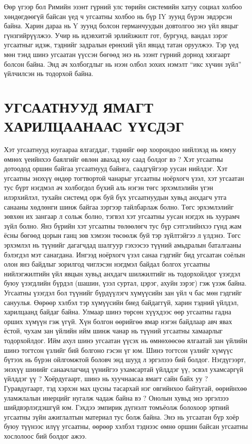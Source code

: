 Өөр үгээр бол Римийн эзэнт гүрний улс төрийн системийн хатуу социал холбоо хөндөгдөөгүй байсан үед ч угсаатны холбоо нь бүр IY зуунд бүрэн эвдэрсэн байна. Харин дараа нь Y зуунд болсон германчуудын довтолгоо энэ үйл явцыг гүнзгийрүүлжээ. Учир нь идэвхитэй эрлийзжилт гот, бургунд, вандал зэрэг угсаатныг идэж, тэднийг задралын ерөнхий үйл явцад татан оруулжээ. Тэр үед мөн тэнд шинэ угсаатан үүссэн бөгөөд энэ нь эзэнт гүрний дорнод хязгаарт болсон байна. Энд ач холбогдлыг нь нээн олбол зохих нэмэлт “икс хүчин зүйл” үйлчилсэн нь тодорхой байна.
\section{УГСААТНУУД ЯМАГТ ХАРИЛЦААНААС ҮҮСДЭГ}
Хэт угсаатнууд юугаараа ялгагддаг, тэднийг өөр хоорондоо нийлэхэд нь юмуу өмнөх үеийнхээ баялгийг өвлөн авахад юу саад болдог вэ ? Хэт угсаатны дотоодод оршин байгаа угсаатнууд байнга, саадгүйгээр уусан нийлдэг. Хэт угсаатны энэхүү өндөр тогтвортой чанарыг угсаатны ноёрхогч үзэл, хэт угсаатан тус бүрт нэгдмэл ач холбогдол бүхий аль нэгэн төгс эрхэмлэлийн үгэн илэрхийлэл, тухайн системд орж буй бүх угсаатнуудын хувьд анхдагч утга санааны хөдлөнги шинж байгаа зэргээр тайлбарлаж болно. Төгс эрхэмлэлийг зөвхөн их зангаар л сольж болно, тэгвэл хэт угсаатны уусан нэгдэх нь хуурамч зүйл болно. Янз бүрийн хэт угсаатны төлөөлөгч тус бүр сэтгэлийнхээ гүнд жам ёсны бөгөөд цорын ганц зөв хэмээн төсөөлж буй тэр зүйлтэйгээ л үлдэнэ. Төгс эрхэмлэл нь түүнийг дагагчдад шалгуур гэхээсээ түүний амьдралын баталгааны бэлэгдэл мэт санагдана. Ингээд ноёрхогч үзэл санаа гэдгийг бид угсаатан соёлын олон янз байдлыг зорилгод чиглэсэн нэгдмэл байдал болгох угсаатны нийлэгжилтийн үйл явцын хувьд анхдагч шилжилтийг нь тодорхойлдог үзэгдэл буюу үзэгдлийн бүрдэл (шашин, үзэл суртал, цэрэг, ахуйн зэрэг) гэж үзэж байна.
Угсаатны үзэгдэл бол түүнийг бүрдүүлэгч хүмүүсийн зан үйл ч бас мөн гэдгийг сануулья. Өөрөөр хэлбэл тэр хүмүүсийн биед байдаггүй, харин тэдний үйлдэл, харилцаанд байдаг байна. Улмаар шинэ төрсөн хүүхдээс өөр угсаатны гадна орших хүмүүн гэж үгүй. Хүн болгон өөрийгөө ямар нэгэн байдлаар авч явах ёстой, чухам зан үйлийн ийм шинж чанар нь түүний угсаатны хамаарлыг тодорхойлдог. Ийм ахул шинэ угсаатан үүсэх нь өмнөхөөсөө ялгаатай зан үйлийн шинэ тогтсон үзлийг бий болгоно гэсэн үг юм. Шинэ тогтсон үзлийг хүмүүс бүтээх нь бүрэн ойлгомжтой боловч энд шууд л эргэлзээ бий болдог. Нэгдүгээрт, энэхүү шинийг санаачлагчид үүнийгээ ухамсартай үйлддэг үү, эсвэл ухамсаргүй үйлддэг үү ? Хоёрдугаарт, шинэ нь хуучнаасаа ямагт сайн байх уу ? Гуравдугаарт, тэд хэрхэн мах цусны тасархай нэг овгийнхоо байтугай, өөрийнхөө уламжлалын инерцийг нугалж чадаж байна вэ ? Онолын хувьд энэ эргэлзээ шийдвэрлэгдэшгүй юм. Гэхдээ эмпирик дүгнэлт томъёолж болохоор эртний угсаатны зүйн ажиглалтын материал тус болж байна. Энэ нь угсаатан бүр хоёр буюу түүнээс илүү угсаатны, өөрөөр хэлбэл тэднээс өмнө оршин байсан угсаатны хослолоос бий болдог ажээ.
